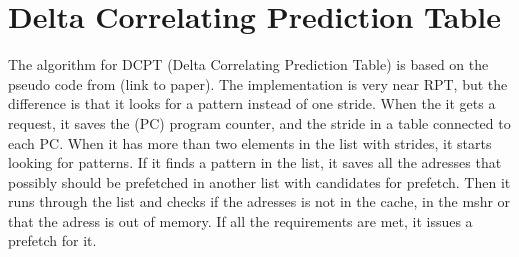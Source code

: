 \section{Delta Correlating Prediction Table}
The algorithm for DCPT (Delta Correlating Prediction Table) is based on the pseudo code from (link to paper).
The implementation is very near RPT, but the difference is that it looks for a pattern instead of one stride.
When the it gets a request, it saves the (PC) program counter, and the stride in a table connected to each PC. When it has more than two elements in the list with strides, it starts looking for patterns.
If it finds a pattern in the list, it saves all the adresses that possibly should be prefetched in another list with candidates for prefetch.
Then it runs through the list and checks if the adresses is not in the cache, in the mshr or that the adress is out of memory. If all the requirements are met, it issues a prefetch for it.
